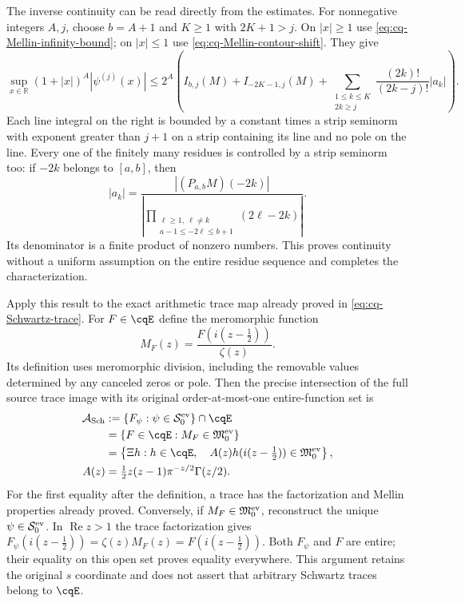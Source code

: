 The inverse continuity can be read directly from the estimates.
For nonnegative integers $A,j$, choose $b=A+1$ and $K\geq1$
with $2K+1>j$. On $|x|\geq1$ use
\eqref{eq:cq-Mellin-infinity-bound}; on $|x|\leq1$ use
\eqref{eq:cq-Mellin-contour-shift}. They give
\begin{equation}\label{eq:cq-Mellin-inverse-seminorm}
 \sup_{x\in\mathbb R}(1+|x|)^A|\psi^{(j)}(x)|
 \leq2^A\left(
 I_{b,j}(M)+I_{-2K-1,j}(M)
 +\sum_{\substack{1\leq k\leq K\\2k\geq j}}
           \frac{(2k)!}{(2k-j)!}|a_k|\right).
\end{equation}
Each line integral on the right is bounded by a constant times
a strip seminorm with exponent greater than $j+1$ on a strip
containing its line and no pole on the line. Every one of the
finitely many residues is controlled by a strip seminorm too:
if $-2k$ belongs to $[a,b]$, then
\[
 |a_k|=
 \frac{|(P_{a,b}M)(-2k)|}
 {\left|\displaystyle\prod_{\substack{\ell\geq1,\ \ell\ne k\\
                         a-1\leq-2\ell\leq b+1}}(2\ell-2k)\right|}.
\]
Its denominator is a finite product of nonzero numbers. This
proves continuity without a uniform assumption on the entire
residue sequence and completes the characterization.

Apply this result to the exact arithmetic trace map already proved
in \eqref{eq:cq-Schwartz-trace}. For $F\in\cqE$ define the
meromorphic function
\[
 M_F(z)=\frac{F(i(z-\tfrac12))}{\zeta(z)}.
\]
Its definition uses meromorphic division, including the removable
values determined by any canceled zeros or pole. Then the precise
intersection of the full source trace image with its original
order-at-most-one entire-function set is
\begin{equation}\label{eq:cq-exact-Schwartz-trace-image}
 \begin{aligned}
 \mathcal A_{\rm Sch}
 &:=\{F_\psi:\psi\in\mathcal S_0^{\rm ev}\}\cap\cqE\\
 &=\{F\in\cqE:M_F\in\mathfrak M_0^{\rm ev}\}\\
 &=\left\{\Xi h:h\in\cqE,\quad
     A(z)h(i(z-\tfrac12))\in\mathfrak M_0^{\rm ev}\right\},\\
 A(z)&=\tfrac12z(z-1)\pi^{-z/2}\Gamma(z/2).
 \end{aligned}
\end{equation}
For the first equality after the definition, a trace has the
factorization and Mellin properties already proved. Conversely,
if $M_F\in\mathfrak M_0^{\rm ev}$, reconstruct the unique
$\psi\in\mathcal S_0^{\rm ev}$. In $\operatorname{Re}z>1$
the trace factorization gives
$F_\psi(i(z-\tfrac12))=\zeta(z)M_F(z)
=F(i(z-\tfrac12))$. Both $F_\psi$ and $F$ are entire;
their equality on this open set proves equality everywhere.
This argument retains the original $s$ coordinate and does not
assert that arbitrary Schwartz traces belong to $\cqE$.

